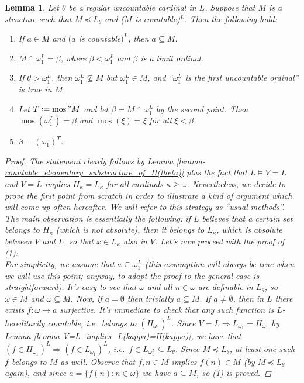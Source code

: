 \documentclass[11pt,a4paper]{report}
\newtheorem{lemma}[theorem]{Lemma}
\theoremstyle{definition}
\theoremstyle{num.custom-title}
\theoremstyle{custom-title}
\DeclareMathOperator{\imp}{\Rightarrow}
\DeclareMathOperator{\sse}{\subseteq}
\DeclareMathOperator{\mos}{mos}
\newcommand*{\defeq}{\mathrel{\rlap{%
                     \raisebox{0.3ex}{$\cdot$}}%
                     \raisebox{-0.3ex}{$\cdot$}}%
                     =}
\begin{document}
\begin{lemma}\label{lemma-countable_elementary_substructure_of_L(theta)}
Let $\theta$ be a regular uncountable cardinal in $L$. Suppose that $M$ is a structure such that $M \preceq L_\theta$ and ($M$ is countable)$^L$. Then the following hold:
\begin{enumerate}
\item If $a \in M$ and $(a$ is countable$)^L$, then $a \sse M$.
\item $M \cap \omega_1^L = \beta$, where $\beta < \omega_1^L$ and $\beta$ is a limit ordinal.
\item If $\theta > \omega_1^L$, then $\omega_1^L \nsubseteq M$ but $\omega_1^L \in M$, and ``$\omega_1^L$ is the first uncountable ordinal'' is true in $M$.
\item Let $T \defeq \mos"M$ and let $\beta = M \cap \omega_1^L$ by the second point. Then $\mos(\omega_1^L) = \beta$ and $\mos(\xi) = \xi$ for all $\xi < \beta$.
\item $\beta = (\omega_1)^T$.
\end{enumerate}
\begin{proof}
The statement clearly follows by Lemma \ref{lemma-countable_elementary_substructure_of_H(theta)} plus the fact that $L \models V=L$ and $V=L$ implies $H_\kappa=L_\kappa$ for all cardinals $\kappa \geq \omega$. Nevertheless, we decide to prove the first point from scratch in order to illustrate a kind of argument which will come up often hereafter. We will refer to this strategy as ``usual methods''. The main observation is essentially the following: if $L$ believes that a certain set belongs to $H_\kappa$ (which is \emph{not} absolute), then it belongs to $L_\kappa$, which \emph{is} absolute between $V$ and $L$, so that $x \in L_\kappa$ also in $V$. Let's now proceed with the proof of (1):\\
For simplicity, we assume that $a \sse \omega_1^L$ (this assumption will always be true when we will use this point; anyway, to adapt the proof to the general case is straightforward). It's easy to see that $\omega$ and all $n \in \omega$ are definable in $L_\theta$, so $\omega \in M$ and $\omega \sse M$. Now, if $a=\emptyset$ then trivially $a \sse M$. If $a \neq \emptyset$, then in $L$ there exists $f \colon \omega \to a$ surjective. It's immediate to check that any such function is $L$-hereditarily countable, i.e.\ belongs to $(H_{\omega_1})^L$. Since $V=L \imp L_{\omega_1} = H_{\omega_1}$ by Lemma \ref{lemma-V=L_implies_L(kappa)=H(kappa)}, we have that $(f \in H_{\omega_1})^L \imp (f \in L_{\omega_1})^L$, i.e.\ $f \in L_{\omega_1^L} \sse L_\theta$. Since $M \preceq L_\theta$, at least one such $f$ belongs to $M$ as well. Observe that $f,n \in M$ implies $f(n) \in M$ (by $M \preceq L_\theta$ again), and since $a = \{f(n) : n \in \omega\}$ we have $a \sse M$, so (1) is proved.
\end{proof}
\end{lemma}
\end{document}
